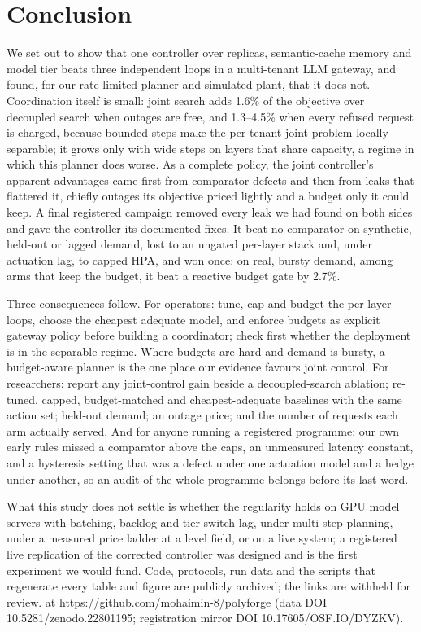 \section{Conclusion}
\label{sec:conclusion}

We set out to show that one controller over replicas, semantic-cache
memory and model tier beats three independent loops in a multi-tenant LLM
gateway, and found, for our rate-limited planner and simulated plant, that
it does not. Coordination itself is small: joint search adds 1.6\% of the
objective over decoupled search when outages are free, and 1.3--4.5\% when
every refused request is charged, because bounded steps make the
per-tenant joint problem locally separable; it grows only with wide steps
on layers that share capacity, a regime in which this planner does worse.
As a complete policy, the joint controller's apparent advantages came first
from comparator defects and then from leaks that flattered it, chiefly
outages its objective priced lightly and a budget only it could keep. A
final registered campaign removed every leak we had found on both sides and
gave the controller its documented fixes. It beat no comparator on
synthetic, held-out or lagged demand, lost to an ungated per-layer stack and,
under actuation lag, to capped HPA, and won once: on real, bursty demand,
among arms that keep the budget, it beat a reactive budget gate by 2.7\%.

Three consequences follow. For operators: tune, cap and budget the
per-layer loops, choose the cheapest adequate model, and enforce budgets as
explicit gateway policy before building a coordinator; check first whether
the deployment is in the separable regime. Where budgets are hard and demand
is bursty, a budget-aware planner is the one place our evidence favours joint
control. For researchers: report any joint-control gain beside a
decoupled-search ablation; re-tuned, capped, budget-matched and
cheapest-adequate baselines with the same action set; held-out demand; an
outage price; and the number of requests each arm actually served. And for
anyone running a registered programme: our own early rules missed a
comparator above the caps, an unmeasured latency constant, and a hysteresis
setting that was a defect under one actuation model and a hedge under
another, so an audit of the whole programme belongs before its last word.

What this study does not settle is whether the regularity holds on GPU
model servers with batching, backlog and tier-switch lag, under multi-step
planning, under a measured price ladder at a level field, or on a live
system; a registered live replication of the corrected controller was
designed and is the first experiment we would fund. Code, protocols, run
data and the scripts that regenerate every table and figure are publicly
archived\ifblind; the links are withheld for review.\else{} at
\url{https://github.com/mohaimin-8/polyforge} (data DOI
10.5281/zenodo.22801195; registration mirror DOI 10.17605/OSF.IO/DYZKV).\fi
